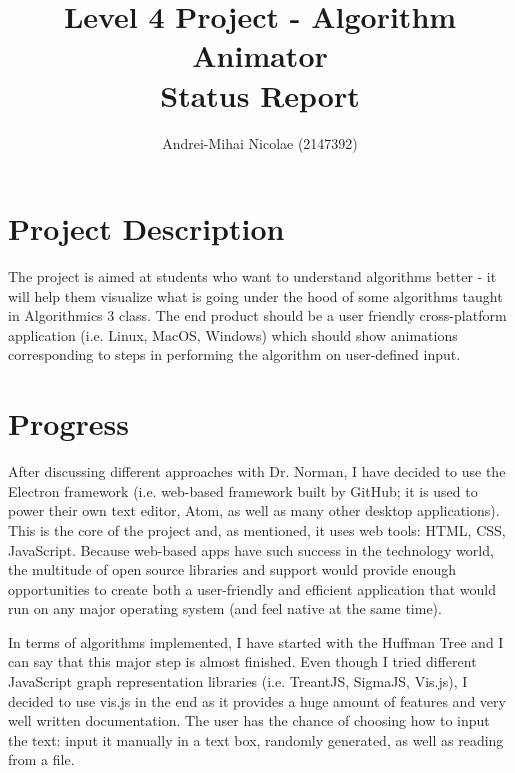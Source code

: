 \documentclass[11pt]{article}
\begin{document}
\posttitle{\end{center}}

\title{Level 4 Project - Algorithm Animator \\ Status Report}
\author{Andrei-Mihai Nicolae (2147392)}

\maketitle

\section{Project Description}
 The project is aimed at students who want to understand algorithms better - it will help them visualize what is going under the hood of some algorithms taught in Algorithmics 3 class. The end product should be a user friendly cross-platform application (i.e. Linux, MacOS, Windows) which should show animations corresponding to steps in performing the algorithm on user-defined input.
 
 \section{Progress}
 After discussing different approaches with Dr. Norman, I have decided to use the Electron framework (i.e. web-based framework built by GitHub; it is used to power their own text editor, Atom, as well as many other desktop applications). This is the core of the project and, as mentioned, it uses web tools: HTML, CSS, JavaScript. Because web-based apps have such success in the technology world, the multitude of open source libraries and support would provide enough opportunities to create both a user-friendly and efficient application that would run on any major operating system (and feel native at the same time).
 
 In terms of algorithms implemented, I have started with the Huffman Tree and I can say that this major step is almost finished. Even though I tried different JavaScript graph representation libraries (i.e. TreantJS, SigmaJS, Vis.js), I decided to use vis.js in the end as it provides a huge amount of features and very well written documentation. The user has the chance of choosing how to input the text: input it manually in a text box, randomly generated, as well as reading from a file. 
 
\end{document}
